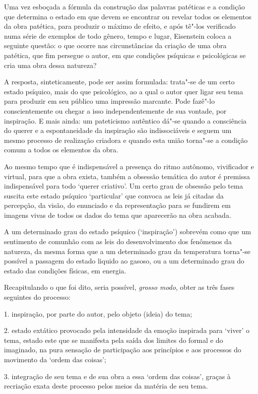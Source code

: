 Uma vez esboçada a fórmula da construção das palavras patéticas e a
condição que determina o estado em que devem se encontrar ou revelar
todos os elementos da obra patética, para produzir o máximo de efeito, e
após tê"-los verificado numa série de exemplos de todo gênero, tempo e
lugar, Eisenstein coloca a seguinte questão: o que ocorre nas
circunstâncias da criação de uma obra patética, que fim persegue o
autor, em que condições psíquicas e psicológicas se cria uma obra dessa
natureza?

A resposta, sinteticamente, pode ser assim formulada: trata"-se de um
certo estado psíquico, mais do que psicológico, ao a qual o autor quer
ligar seu tema para produzir em seu público uma impressão marcante. Pode
fazê"-lo conscientemente ou chegar a isso independentemente de sua
vontade, por inspiração. E mais ainda: um pateticismo autêntico dá"-se
quando a consciência do querer e a espontaneidade da inspiração são
indissociáveis e seguem um mesmo processo de realização criadora e
quando esta união torna"-se a condição comum a todos os elementos da
obra.

Ao mesmo tempo que é indispensável a presença do ritmo autônomo,
vivificador e virtual, para que a obra exista, também a obsessão
temática do autor é premissa indispensável para todo `querer criativo'.
Um certo grau de obsessão pelo tema suscita este estado psíquico
`particular' que convoca as leis já citadas da percepção, da visão, do
enunciado e da representação para se fundirem em imagens vivas de todos
os dados do tema que aparecerão na obra acabada.

A um determinado grau do estado psíquico (`inspiração') sobrevém como
que um sentimento de comunhão com as leis do desenvolvimento dos
fenômenos da natureza, da mesma forma que a um determinado grau da
temperatura torna"-se possível a passagem do estado liquido ao gasoso, ou
a um determinado grau do estado das condições físicas, em energia.

Recapitulando o que foi dito, seria possível, \emph{grosso modo}, obter
as três fases seguintes do processo:

1. inspiração, por parte do autor, pelo objeto (ideia) do tema;

2. estado extático provocado pela intensidade da emoção inspirada para
`viver' o tema, estado este que se manifesta pela saída dos limites do
formal e do imaginado, na pura sensação de participação aos princípios e
aos processos do movimento da `ordem das coisas';

3. integração de seu tema e de sua obra a essa `ordem das coisas',
graças à recriação exata deste processo pelos meios da matéria de seu
tema.


